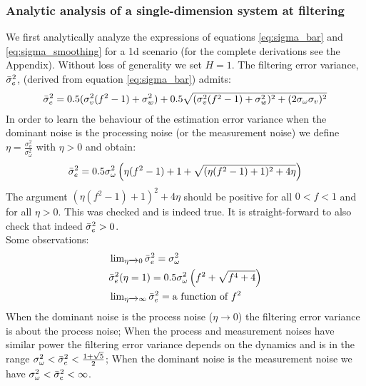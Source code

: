 \documentclass[oneside,12pt]{article}
\begin{document}
\subsubsection{Analytic analysis of a single-dimension system at filtering}
We first analytically analyze the expressions of equations \ref{eq:sigma_bar} and \ref{eq:sigma_smoothing} for a 1d scenario (for the complete derivations see the Appendix). Without loss of generality we set $H=1$. The filtering error variance, $\Bar{\sigma}_e^2$, (derived from equation \ref{eq:sigma_bar}) admits:
%
\begin{equation}\label{eq:sigma_bar_1d}
    \begin{split}
        \Bar{\sigma}_e^2 &= 0.5(\sigma_v^2(f^2-1) + \sigma_w^2) + 0.5\sqrt{(\sigma_v^2(f^2-1) + \sigma_w^2)^2 + (2\sigma_\omega\sigma_v)^2}\\
    \end{split}
\end{equation}
%
In order to learn the behaviour of the estimation error variance when the dominant noise is the processing noise (or the measurement noise) we define $\eta = \frac{\sigma_v^2}{\sigma_\omega^2}$ with $\eta>0$ and obtain:
%
\begin{equation}\label{eq:sigma_bar_1d_eta}
    \begin{split}
        \Bar{\sigma}_e^2 &= 0.5\sigma_\omega^2\left(\eta (f^2-1) + 1 + \sqrt{(\eta (f^2-1) + 1)^2 + 4\eta }\right)\\
    \end{split}
\end{equation}
%
The argument $(\eta (f^2-1) + 1)^2 + 4\eta$ should be positive for all $0<f<1$ and for all $\eta>0$. This was checked and is indeed true. It is straight-forward to also check that indeed $\Bar{\sigma}_e^2 > 0$.\\
Some observations:
%
\begin{equation}
    \begin{split}
        &\operatorname{lim}_{\eta \xrightarrow{} 0}\Bar{\sigma}_e^2 = \sigma_\omega^2\\
        &\Bar{\sigma}_e^2(\eta=1) = 0.5\sigma_\omega^2\left(f^2 + \sqrt{f^4 + 4}\right)\\
        &\operatorname{lim}_{\eta \xrightarrow{} \infty}\Bar{\sigma}_e^2 =\text{a function of }f^2\\
    \end{split}
\end{equation}
%
When the dominant noise is the process noise ($\eta \xrightarrow{} 0$) the filtering error variance is about the process noise; When the process and measurement noises have similar power the filtering error variance depends on the dynamics and is in the range $\sigma_\omega^2 < \Bar{\sigma}_e^2 < \frac{1+\sqrt{5}}{2}$; When the dominant noise is the measurement noise we have $\sigma_\omega^2 < \Bar{\sigma}_e^2 < \infty$.\\\\ 
\end{document}
